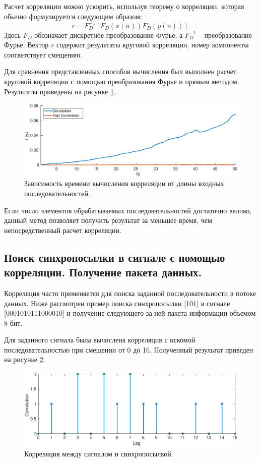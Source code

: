 \documentclass[a4paper,14pt]{extarticle}
\begin{document}
Расчет корреляции можно ускорить, используя теорему о корреляции, которая обычно формулируется следующим образом:
\begin{equation*}
r = F_D^{-1} [F_D(x(n))F_D(y(n))].
\end{equation*} 
Здесь $F_D$ обозначает дискретное преобразование Фурье, а $F_D^{-1}$ -- преобразование Фурье. Вектор $r$ содержит результаты круговой корреляции, номер компоненты соответствует смещению.

Для сравнения представленных способов вычисления был выполнен расчет круговой корреляции с помощью преобразования Фурье и прямым методом. Результаты приведены на рисунке \ref{tm}.
\begin{figure}[H]
\includegraphics[width=1\textwidth]{time_measure.eps}
\captionsetup{justification=centering,margin=1cm}
\caption{Зависимость времени вычисления корреляции от длины входных последовательностей.}
\label{tm}
\end{figure}
Если число элементов обрабатываемых последовательностей достаточно велико, данный метод позволяет получить результат за меньшее время, чем непосредственный расчет корреляции.

\subsection{Поиск синхропосылки в сигнале с помощью корреляции. Получение пакета данных.}

Корреляция часто применяется для поиска заданной последовательности в потоке данных. Ниже рассмотрен пример поиска синхропосылки 
[101] в сигнале [0001010111000010] и получение следующего за ней пакета информации объемом 8 бит.

Для заданного сигнала была вычислена корреляция с искомой последовательностью при смещении от 0 до 16. Полученный результат приведен на рисунке \ref{corr}.

\begin{figure}[H]
\includegraphics[width=1\textwidth]{corr.eps}
\captionsetup{justification=centering,margin=1cm}
\caption{Корреляция между сигналом и синхропосылкой.}
\label{corr}
\end{figure}
\end{document}
